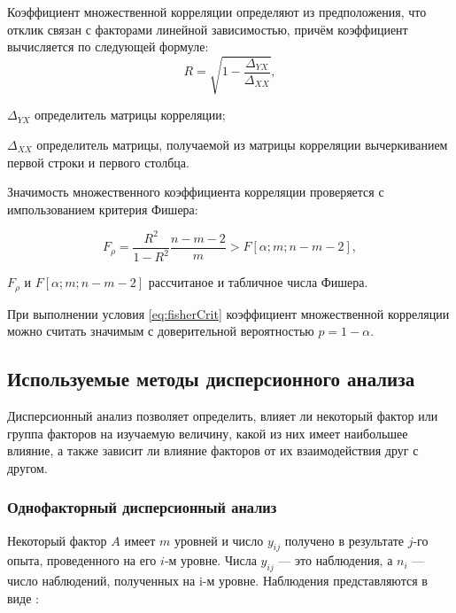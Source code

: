 Коэффициент множественной корреляции определяют из предположения, что отклик связан с факторами линейной зависимостью, причём коэффициент вычисляется по следующей формуле:
\begin{equation}
\label{eq:fuckMark}
R = \sqrt{1 - \frac{\Delta_{YX}}{\Delta_{XX}}},
\end{equation}
\begin{eqexpl}[15mm]
\item{$\Delta_{YX}$} определитель матрицы корреляции;
\item{$\Delta_{XX}$} определитель матрицы, получаемой из матрицы корреляции вычеркиванием первой строки и первого столбца.
\end{eqexpl}

Значимость множественного коэффициента корреляции проверяется с импользованием критерия Фишера:

\begin{equation}
\label{eq:fisherCrit}
F_\rho = \frac{R^2}{1-R^2} \frac{n - m - 2}{m} > F\left[{\alpha;m;n-m-2}\right],
\end{equation}
\begin{eqexpl}[60mm]
\item{$F_\rho$ и $F\left[\alpha;m;n-m-2\right]$} рассчитаное и табличное числа Фишера.
\end{eqexpl}

При выполнении условия \eqref{eq:fisherCrit} коэффициент множественной корреляции можно считать значимым с доверительной вероятностью $p = 1 - \alpha$.

\subsection{Используемые методы дисперсионного анализа}

Дисперсионный анализ позволяет определить, влияет ли некоторый фактор или группа факторов на изучаемую величину, какой из них имеет наибольшее влияние, а также зависит ли влияние факторов от их взаимодействия друг с другом. \cite{disperMethod}

\subsubsection{Однофакторный дисперсионный анализ}
Некоторый фактор $A$ имеет $m$ уровней и число $y_{ij}$ получено в результате $j$-го опыта, проведенного на его $i$-м уровне. Числа $y_{ij}$ --- это наблюдения, а $n_i$ --- число наблюдений, полученных на i-м уровне. Наблюдения представляются в виде \cite{disperMethod}:


